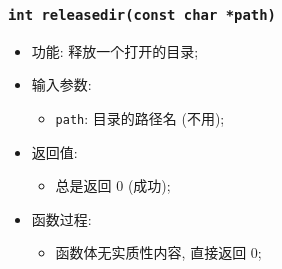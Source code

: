 \documentclass[nofonts, titlepage]{ctexart}
\begin{document}
  \subsubsection[\texttt{releasedir}]{\texttt{int releasedir(const char *path)}}
  \begin{itemize}
\item
  功能: 释放一个打开的目录;
\item
  输入参数:

  \begin{itemize}
  \item
    \texttt{path}: 目录的路径名 (不用);
  \end{itemize}
\item
  返回值:

  \begin{itemize}
  \item
    总是返回 0 (成功);
  \end{itemize}
\item
  函数过程:

  \begin{itemize}
  \item
    函数体无实质性内容, 直接返回 0;
  \end{itemize}
  \end{itemize}
\end{document}
